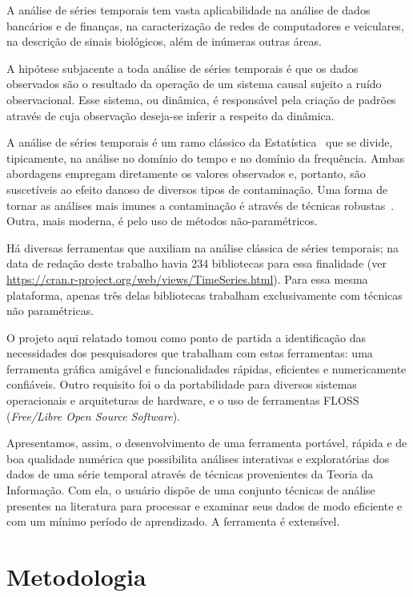 \documentclass[journal,a4paper,11pt]{IEEEtran}
\begin{document}
 A análise de séries temporais tem vasta aplicabilidade na análise de dados bancários e de finanças, na caracterização de redes de computadores e veiculares, na descrição de sinais biológicos, além de inúmeras outras áreas.
 
 A hipótese subjacente a toda análise de séries temporais é que os dados observados são o resultado da operação de um sistema causal sujeito a ruído observacional.
 Esse sistema, ou dinâmica, é responsável pela criação de padrões através de cuja observação deseja-se inferir a respeito da dinâmica.
 
 A análise de séries temporais é um ramo clássico da Estatística~\cite{BrockwellDavis91} que se divide, tipicamente, na análise no domínio do tempo e no domínio da frequência.
 Ambas abordagens empregam diretamente os valores observados e, portanto, são suscetíveis ao efeito danoso de diversos tipos de contaminação.
 Uma forma de tornar as análises mais imunes a contaminação é através de técnicas robustas~\cite{BustosFraiman1984}.
 Outra, mais moderna, é pelo uso de métodos não-paramétricos.
 
 Há diversas ferramentas que auxiliam na análise clássica de séries temporais; na data de redação deste trabalho havia \num{234} bibliotecas para essa finalidade (ver \url{https://cran.r-project.org/web/views/TimeSeries.html}).
 	Para essa mesma plataforma, apenas três delas bibliotecas trabalham exclusivamente com técnicas não paramétricas.
    
O projeto aqui relatado tomou como ponto de partida a identificação das necessidades dos pesquisadores que trabalham com estas ferramentas: uma ferramenta gráfica amigável e funcionalidades rápidas, eficientes e numericamente confiáveis.
 Outro requisito foi o da portabilidade para diversos sistemas operacionais e arquiteturas de hardware, e o uso de ferramentas FLOSS (\textit{Free/Libre Open Source Software}).
 
 Apresentamos, assim, o desenvolvimento de uma ferramenta portável, rápida e de boa qualidade numérica que possibilita análises interativas e exploratórias dos dados de uma série temporal através de técnicas provenientes da Teoria da Informação.
 Com ela, o usuário dispõe de uma conjunto técnicas de análise presentes na literatura para processar e examinar seus dados de modo eficiente e com um mínimo período de aprendizado.
 A ferramenta é extensível.
    
\section*{\textbf{Metodologia}}
\end{document}
